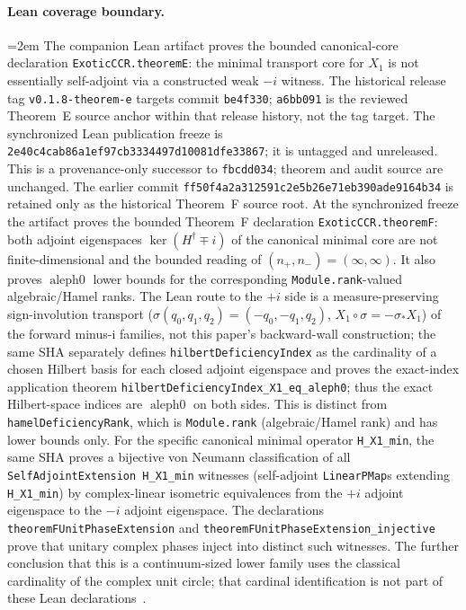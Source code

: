 ﻿\documentclass[11pt]{article}
\begin{document}
\paragraph{Lean coverage boundary.}
\begingroup
\emergencystretch=2em
The companion Lean artifact proves the bounded canonical-core declaration
\texttt{ExoticCCR.theoremE}: the minimal transport core for \(X_1\) is not
essentially self-adjoint via a constructed weak \(-i\) witness. The historical
release tag \texttt{v0.1.8-theorem-e} targets commit \texttt{be4f330};
\texttt{a6bb091} is the reviewed Theorem~E source anchor within that release
history, not the tag target. The synchronized Lean
publication freeze is
{\small\texttt{2e40c4cab86a1ef97cb3334497d10081dfe33867}}; it is untagged and
unreleased. This is a provenance-only successor to \texttt{fbcdd034};
theorem and audit source are unchanged. The earlier commit
\texttt{ff50f4a2a312591c2e5b26e71eb390ade9164b34} is retained only as the
historical Theorem~F source root. At the synchronized freeze the artifact proves
the bounded Theorem~F declaration \texttt{ExoticCCR.theoremF}: both adjoint
eigenspaces $\ker(H^\dagger \mp i)$ of the canonical minimal core are not
finite-dimensional and the bounded reading of
$(n_+,n_-)=(\infty,\infty)$. It also proves \(\operatorname{aleph0}\) lower
bounds for the corresponding \texttt{Module.rank}-valued algebraic/Hamel
ranks. The
Lean route to the $+i$ side is a measure-preserving sign-involution transport
($\sigma(q_0,q_1,q_2)=(-q_0,-q_1,q_2)$, $X_1\circ\sigma=-\sigma_*X_1$) of the
forward minus-i families, not this paper's backward-wall construction; the
same SHA separately defines \texttt{hilbertDeficiencyIndex} as the cardinality
of a chosen Hilbert basis for each closed adjoint eigenspace and proves the
exact-index application theorem
\texttt{hilbertDeficiencyIndex}\allowbreak\texttt{\_X1\_eq\_aleph0}; thus the exact Hilbert-space
indices are $\operatorname{aleph0}$ on both sides. This is distinct from
\texttt{hamelDeficiencyRank}, which is \texttt{Module.rank}
(algebraic/Hamel rank) and has lower bounds only. For the specific canonical
minimal operator \texttt{H\_X1\_min}, the same SHA proves a bijective von
Neumann classification of all
\texttt{SelfAdjoint}\allowbreak\texttt{Extension H\_X1\_min}
witnesses (self-adjoint \texttt{LinearPMap}s extending
\texttt{H\_X1\_min}) by complex-linear isometric equivalences from the $+i$
adjoint eigenspace to the $-i$ adjoint eigenspace. The declarations
\texttt{theoremF}\allowbreak\texttt{UnitPhase}\allowbreak\texttt{Extension} and
\texttt{theoremF}\allowbreak\texttt{UnitPhase}\allowbreak\texttt{Extension\_injective}
prove that unitary complex
phases inject into distinct such witnesses. The further conclusion that this
is a continuum-sized lower family uses the classical cardinality of the
complex unit circle; that cardinal identification is not part of these Lean
declarations~\cite{FredriksenLeanF}.
\end{document}
